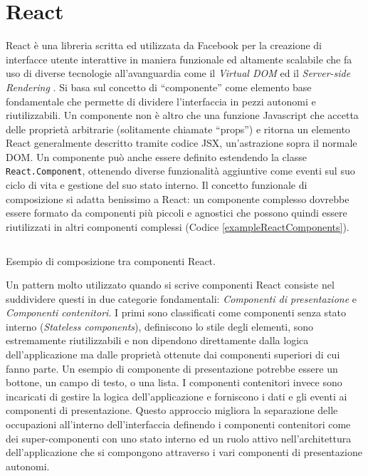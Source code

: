 \section{React}
\label{ReactExplanation}
React è una libreria scritta ed utilizzata da Facebook per la creazione di interfacce utente interattive in maniera funzionale ed altamente scalabile che fa uso di diverse tecnologie all'avanguardia come il \textit{Virtual DOM} ed il \textit{Server-side Rendering} \cite{WheelerOnReact}. 
Si basa sul concetto di “componente” come elemento base fondamentale che permette di dividere l'interfaccia in pezzi autonomi e riutilizzabili.
Un componente non è altro che una funzione Javascript che accetta delle proprietà arbitrarie (solitamente chiamate “props”) e ritorna un elemento React generalmente descritto tramite codice JSX, un'astrazione sopra il normale DOM. Un componente può anche essere definito estendendo la classe \texttt{React.Component}, ottenendo diverse funzionalità aggiuntive come eventi sul suo ciclo di vita e gestione del suo stato interno. Il concetto funzionale di composizione si adatta benissimo a React: un componente complesso dovrebbe essere formato da componenti più piccoli e agnostici che possono quindi essere riutilizzati in altri componenti complessi (Codice \ref{exampleReactComponents}).

\begin{listing}[ht]
\inputminted{jsx}{sources/exampleReactComponents.js}
\caption{Esempio di composizione tra componenti React.}
\label{exampleReactComponents}
\end{listing}

\noindent
Un pattern molto utilizzato quando si scrive componenti React consiste nel suddividere questi in due categorie fondamentali: \textit{Componenti di presentazione} e \textit{Componenti contenitori}. I primi sono classificati come componenti senza stato interno (\textit{Stateless components}), definiscono lo stile degli elementi, sono estremamente riutilizzabili e non dipendono direttamente dalla logica dell'applicazione ma dalle proprietà ottenute dai componenti superiori di cui fanno parte. Un esempio di componente di presentazione potrebbe essere un bottone, un campo di testo, o una lista.
I componenti contenitori invece sono incaricati di gestire la logica dell'applicazione e forniscono i dati e gli eventi ai componenti di presentazione. Questo approccio migliora la separazione delle occupazioni all'interno dell'interfaccia definendo i componenti contenitori come dei super-componenti con uno stato interno ed un ruolo attivo nell'architettura dell'applicazione che si compongono attraverso i vari componenti di presentazione autonomi.

